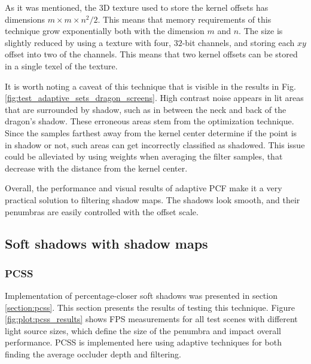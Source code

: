 As it was mentioned, the 3D texture used to store the kernel offsets has dimensions \(m\times m \times n^2/2\). This means that memory requirements of this technique grow exponentially both with the dimension \(m\) and \(n\). The size is slightly reduced by using a texture with four, \(32\)-bit channels, and storing each \(xy\) offset into two of the channels. This means that two kernel offsets can be stored in a single texel of the texture.

It is worth noting a caveat of this technique that is visible in the results in Fig. \ref{fig:test_adaptive_sets_dragon_screens}. High contrast noise appears in lit areas that are surrounded by shadow, such as in between the neck and back of the dragon's shadow. These erroneous areas stem from the optimization technique. Since the samples farthest away from the kernel center determine if the point is in shadow or not, such areas can get incorrectly classified as shadowed. This issue could be alleviated by using weights when averaging the filter samples, that decrease with the distance from the kernel center.

Overall, the performance and visual results of adaptive PCF make it a very practical solution to filtering shadow maps. The shadows look smooth, and their penumbras are easily controlled with the offset scale.

\subsection{Soft shadows with shadow maps}

\subsubsection{PCSS}
Implementation of percentage-closer soft shadows was presented in section \ref{section:pcss}. This section presents the results of testing this technique. Figure \ref{fig:plot:pcss_results} shows FPS measurements for all test scenes with different light source sizes, which define the size of the penumbra and impact overall performance. PCSS is implemented here using adaptive techniques for both finding the average occluder depth and filtering.

